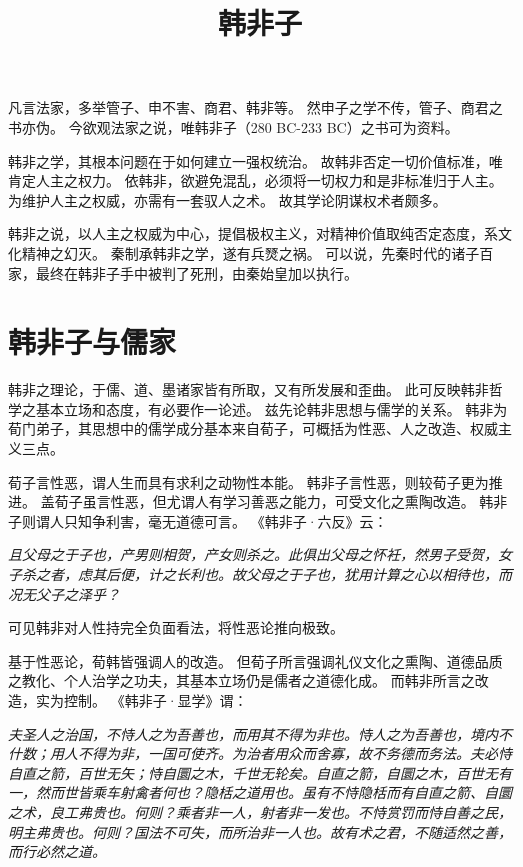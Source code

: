 \documentclass[11pt]{article}
\title{韩非子}
\date{}
\begin{document}
  \maketitle
  
  \newpage

  \linenumbers

凡言法家，多举管子、申不害、商君、韩非等。
然申子之学不传，管子、商君之书亦伪。
今欲观法家之说，唯韩非子（280 BC-233 BC）之书可为资料。

\newline

韩非之学，其根本问题在于如何建立一强权统治。
故韩非否定一切价值标准，唯肯定人主之权力。
依韩非，欲避免混乱，必须将一切权力和是非标准归于人主。
为维护人主之权威，亦需有一套驭人之术。
故其学论阴谋权术者颇多。

\newline

韩非之说，以人主之权威为中心，提倡极权主义，对精神价值取纯否定态度，系文化精神之幻灭。
秦制承韩非之学，遂有兵燹之祸。
可以说，先秦时代的诸子百家，最终在韩非子手中被判了死刑，由秦始皇加以执行。
  
\section{韩非子与儒家}
韩非之理论，于儒、道、墨诸家皆有所取，又有所发展和歪曲。
此可反映韩非哲学之基本立场和态度，有必要作一论述。
兹先论韩非思想与儒学的关系。
韩非为荀门弟子，其思想中的儒学成分基本来自荀子，可概括为性恶、人之改造、权威主义三点。

\newline

荀子言性恶，谓人生而具有求利之动物性本能。
韩非子言性恶，则较荀子更为推进。
盖荀子虽言性恶，但尤谓人有学习善恶之能力，可受文化之熏陶改造。
韩非子则谓人只知争利害，毫无道德可言。
《韩非子·六反》云：

\textit{且父母之于子也，产男则相贺，产女则杀之。此俱出父母之怀衽，然男子受贺，女子杀之者，虑其后便，计之长利也。故父母之于子也，犹用计算之心以相待也，而况无父子之泽乎？}
  
可见韩非对人性持完全负面看法，将性恶论推向极致。

\newline

基于性恶论，荀韩皆强调人的改造。
但荀子所言强调礼仪文化之熏陶、道德品质之教化、个人治学之功夫，其基本立场仍是儒者之道德化成。
而韩非所言之改造，实为控制。
《韩非子·显学》谓：

\textit{夫圣人之治国，不恃人之为吾善也，而用其不得为非也。恃人之为吾善也，境内不什数；用人不得为非，一国可使齐。为治者用众而舍寡，故不务德而务法。夫必恃自直之箭，百世无矢；恃自圜之木，千世无轮矣。自直之箭，自圜之木，百世无有一，然而世皆乘车射禽者何也？隐栝之道用也。虽有不恃隐栝而有自直之箭、自圜之术，良工弗贵也。何则？乘者非一人，射者非一发也。不恃赏罚而恃自善之民，明主弗贵也。何则？国法不可失，而所治非一人也。故有术之君，不随适然之善，而行必然之道。}
\end{document}
